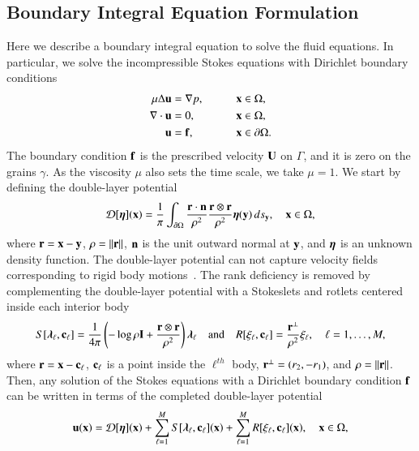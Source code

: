 \documentclass[preprint, 10pt]{elsarticle}
\begin{document}
\subsection{Boundary Integral Equation Formulation} 
\label{sec:bies}
Here we describe a boundary integral equation to solve the fluid
equations. In particular, we solve the incompressible Stokes equations
with Dirichlet boundary conditions 
\begin{alignat*}{3}
  \mu\Delta {\mathbf{u}} &= {\nabla} p, \qquad && {\mathbf{x}} \in \Omega, \\
  {\nabla} \cdot {\mathbf{u}} &= 0,   && {\mathbf{x}} \in \Omega, \\
  {\mathbf{u}} &= {\mathbf{f}},  && {\mathbf{x}} \in {\partial}\Omega.
\end{alignat*}
The boundary condition ${\mathbf{f}}$ is the prescribed velocity ${\mathbf{U}}$ on
$\Gamma$, and it is zero on the grains $\gamma$.  As the viscosity $\mu$
also sets the time scale, we take $\mu=1$.  We start by defining the
double-layer potential
\begin{align}
  {\mathcal{D}}[{\boldsymbol\eta}]({\mathbf{x}}) = \frac{1}{\pi} \int_{{\partial}\Omega} 
    \frac{{\mathbf{r}} \cdot {\mathbf{n}}}{\rho^2} \frac{{\mathbf{r}} \otimes {\mathbf{r}}}{\rho^2} 
    {\boldsymbol\eta}({\mathbf{y}}) \, ds_{\mathbf{y}}, \quad {\mathbf{x}} \in \Omega,
    \label{eqn:velocityDLP}
\end{align}
where ${\mathbf{r}} = {\mathbf{x}} - {\mathbf{y}}$, $\rho = \|{\mathbf{r}}\|$, ${\mathbf{n}}$ is the unit outward
normal at ${\mathbf{y}}$, and ${\boldsymbol\eta}$ is an unknown density function.  The
double-layer potential can not capture velocity fields corresponding to
rigid body motions~\cite{pow-mir1987}.  The rank deficiency is removed
by complementing the double-layer potential with a Stokeslets and
rotlets centered inside each interior body
\begin{align}
  S[{\boldsymbol\lambda}_\ell,{\mathbf{c}}_\ell] = \frac{1}{4\pi} \left(-\log \rho {\mathbf{I}} + 
    \frac{{\mathbf{r}} \otimes {\mathbf{r}}}{\rho^2} \right){\boldsymbol\lambda}_\ell
  \quad \text{and} \quad
  R[\xi_\ell,{\mathbf{c}}_\ell] = \frac{{\mathbf{r}}^\perp}{\rho^2}\xi_\ell, 
  \quad \ell=1,\ldots,M,
  \label{eqn:stokeslet_rotlet}
\end{align}
where  ${\mathbf{r}} = {\mathbf{x}} - {\mathbf{c}}_\ell$, ${\mathbf{c}}_\ell$ is a point inside the
$\ell^{th}$ body, ${\mathbf{r}}^\perp = (r_2,-r_1)$, and $\rho = \|{\mathbf{r}}\|$.  Then,
any solution of the Stokes equations with a Dirichlet boundary condition
${\mathbf{f}}$ can be written in terms of the completed double-layer potential
\begin{align}
  \label{eqn:completed_DLP}
  {\mathbf{u}}({\mathbf{x}}) = {\mathcal{D}}[{\boldsymbol\eta}]({\mathbf{x}}) + 
    \sum_{\ell=1}^{M} S[{\boldsymbol\lambda}_\ell,{\mathbf{c}}_\ell]({\mathbf{x}}) +
    \sum_{\ell=1}^{M} R[\xi_\ell,{\mathbf{c}}_\ell]({\mathbf{x}}), \quad {\mathbf{x}} \in \Omega,
\end{align}
\end{document}

